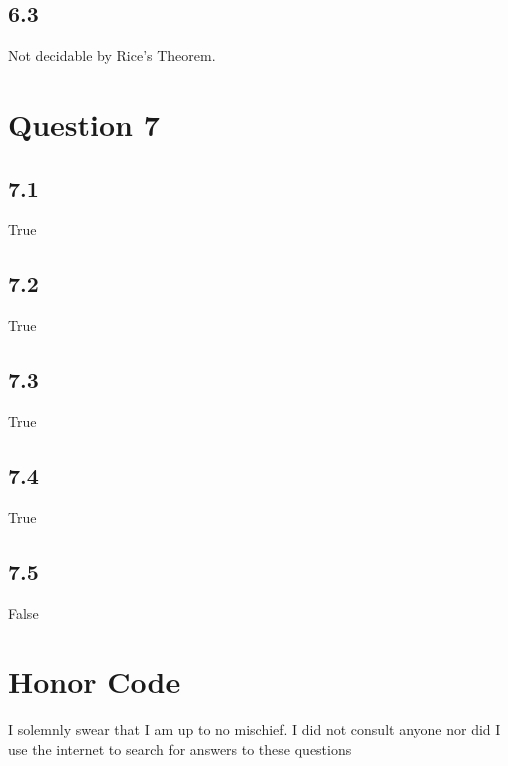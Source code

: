 \documentclass[a4paper, 11pt]{article}
\begin{document}
\subsection*{6.3}
Not decidable by Rice's Theorem.

\section*{Question 7}
\subsection*{7.1}
True
\subsection*{7.2}
True
\subsection*{7.3}
True
\subsection*{7.4}
True
\subsection*{7.5}
False
\newpage
\section*{Honor Code}
\noindent I solemnly swear that I am up to no mischief. I did not consult
anyone nor did I use the internet to search for answers to these
questions
\end{document}
